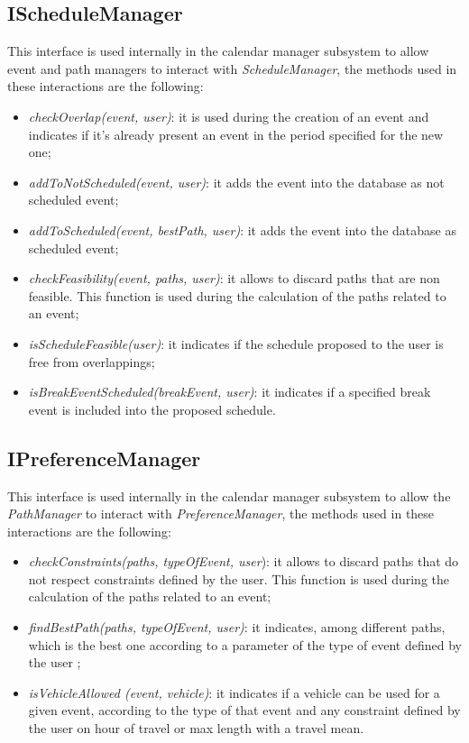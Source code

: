 \subsection{IScheduleManager}
This interface is used internally in the calendar manager subsystem to allow event and path managers to interact with \textit{ScheduleManager}, the methods used in these interactions are the following:
\begin{itemize}
\item \textit{checkOverlap(event, user)}: it is used during the creation of an event and indicates if it's already present an event in the period specified for the new one;
\item \textit{addToNotScheduled(event, user)}: it adds the event into the database as not scheduled event;
\item \textit{addToScheduled(event, bestPath, user)}: it adds the event into the database as scheduled event;
\item \textit{checkFeasibility(event, paths, user)}: it allows to discard paths that are non feasible. This function is used during the calculation of the paths related to an event;
\item \textit{isScheduleFeasible(user)}: it indicates if the schedule proposed to the user is free from overlappings;
\item \textit{isBreakEventScheduled(breakEvent, user)}: it indicates if a specified break event is included into the proposed schedule.
\end{itemize}

\subsection{IPreferenceManager}
This interface is used internally in the calendar manager subsystem to allow the \textit{PathManager} to interact with \textit{PreferenceManager}, the methods used in these interactions are the following:
\begin{itemize}
\item \textit{checkConstraints(paths, typeOfEvent, user}): it allows to discard paths that do not respect constraints defined by the user. This function is used during the calculation of the paths related to an event;
\item \textit{findBestPath(paths, typeOfEvent, user)}: it indicates, among different paths, which is the best one according to a parameter of the type of event defined by the user ;
\item \textit{isVehicleAllowed (event, vehicle)}: it indicates if a vehicle can be used for a given event, according to the type of that event and any constraint defined by the user on hour of travel or max length with a travel mean.
\end{itemize}

